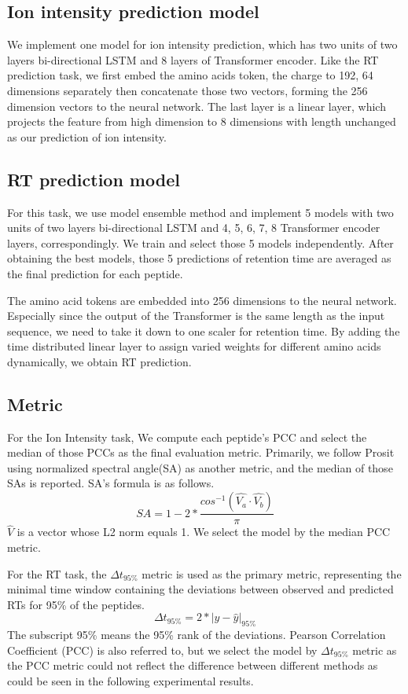 \subsection{Ion intensity prediction model}

We implement one model for ion intensity prediction, which has two units of two layers bi-directional LSTM and 8 layers of Transformer encoder. Like the RT prediction task, we first embed the amino acids token, the charge to 192, 64 dimensions separately then concatenate those two vectors, forming the 256 dimension vectors to the neural network. The last layer is a linear layer, which projects the feature from high dimension to 8 dimensions with length unchanged as our prediction of ion intensity.


\subsection{RT prediction model}
For this task, we use model ensemble method and implement
5 models with two units of two layers bi-directional LSTM and 4, 5, 6, 7, 8 Transformer encoder layers, correspondingly. We train and select those 5 models independently. After obtaining the best models, those 5 predictions of retention time are averaged as the final prediction for each peptide.

The amino acid tokens are embedded into 256 dimensions to the neural network.
Especially since the output of the Transformer is the same length as the input sequence, we need to take it down to one scaler for retention time. By adding the time distributed linear layer to assign varied weights for different amino acids dynamically, we obtain RT prediction.


\subsection{Metric}


For the Ion Intensity task, We compute each peptide's PCC and select the median of those PCCs as the final evaluation metric. Primarily, we follow Prosit~\cite{gessulat2019prosit} using normalized
spectral angle(SA) as another metric, and the median of those SAs is reported.
SA's formula is as follows.
\[ SA = 1 - 2 * \frac{cos^{-1}(\hat{V_a}\cdot\hat{V_b})}{\pi} \]
$\hat{V}$ is a vector whose L2 norm equals 1. We select the model by the median PCC metric.

For the RT task, the $\Delta$$t_{95\%}$ metric is used as the primary metric, representing the minimal time window containing the deviations between observed and predicted RTs for 95\% of the peptides.
\[ \Delta t_{95\%} = 2 * | y - \hat{y} |_{95\%} \]
The subscript 95\% means the 95\% rank of the deviations.
Pearson Correlation Coefficient (PCC) is also referred to, but we select the model by $\Delta$$t_{95\%}$ metric as the PCC metric could not reflect the difference between different methods as could be seen in the following experimental results.